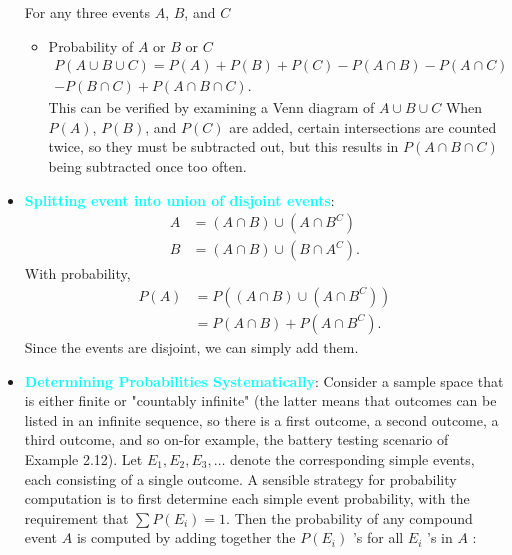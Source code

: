 \documentclass{report}
\begin{document}
\begin{itemize}
\begin{itemize}
            \end{itemize}
            For any three events $A$, $B$, and $C$
            \begin{itemize}
                \item Probability of $A$ or $B$ or $C$
                    \begin{align*}
                        P(A \cup B \cup C) = P(A) + P(B) + P(C) - P(A \cap B) - P(A \cap C)  \\
                        - P(B\cap C) + P(A \cap B \cap C)
                    .\end{align*}
                    This can be verified by examining a Venn diagram of $A \cup B \cup C $
                    When \( P(A) \), \( P(B) \), and \( P(C) \) are added, certain intersections are counted twice, so they must be subtracted out, but this results in \( P(A \cap B \cap C) \) being subtracted once too often.
            \end{itemize}
        \item \textbf{\textcolor{cyan}{Splitting event into union of disjoint events}}:
            \begin{align*}
                A &= (A \cap B) \cup (A \cap B^{C}) \\
                B &= (A \cap B) \cup (B \cap A^{C})
            .\end{align*}
            With probability,
            \begin{align*}
                P(A) &= P((A\cap B) \cup (A\cap B^{C})) \\
                &=P(A\cap B) + P(A \cap B^{C})
            .\end{align*}
            Since the events are disjoint, we can simply add them.
        \item \textbf{\textcolor{cyan}{Determining Probabilities Systematically}}:
            Consider a sample space that is either finite or "countably infinite" (the latter means that outcomes can be listed in an infinite sequence, so there is a first outcome, a second outcome, a third outcome, and so on-for example, the battery testing scenario of Example 2.12). Let $E_1, E_2, E_3, \ldots$ denote the corresponding simple events, each consisting of a single outcome. A sensible strategy for probability computation is to first determine each simple event probability, with the requirement that $\sum P\left(E_i\right)=1$. Then the probability of any compound event $A$ is computed by adding together the $P\left(E_i\right)$ 's for all $E_i$ 's in $A$ :
            $$
$$
\end{itemize}
\end{document}
